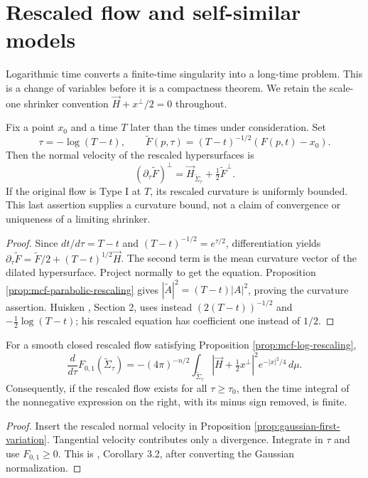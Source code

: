 \chapter{Rescaled flow and self-similar models}\label{sec:mcf-rescaled-models}
Logarithmic time converts a finite-time singularity into a long-time problem. This is a change of variables before it is a compactness theorem. We retain the scale-one shrinker convention $\vec H+x^\perp/2=0$ throughout.

\begin{proposition}\label{prop:mcf-log-rescaling}
Fix a point $x_0$ and a time $T$ later than the times under consideration. Set
\[
 \tau=-\log(T-t),\qquad
 \widetilde F(p,\tau)=(T-t)^{-1/2}(F(p,t)-x_0).
\]
Then the normal velocity of the rescaled hypersurfaces is
\[
 (\partial_\tau\widetilde F)^\perp=
 \vec H_{\widetilde\Sigma_\tau}+\tfrac12\widetilde F^\perp.
\]
If the original flow is Type I at $T$, its rescaled curvature is uniformly bounded. This last assertion supplies a curvature bound, not a claim of convergence or uniqueness of a limiting shrinker.
\end{proposition}
\begin{proof}
Since $dt/d\tau=T-t$ and $(T-t)^{-1/2}=e^{\tau/2}$, differentiation yields
$\partial_\tau\widetilde F=\widetilde F/2+(T-t)^{1/2}\vec H$.
The second term is the mean curvature vector of the dilated hypersurface. Project normally to get the equation. Proposition \ref{prop:mcf-parabolic-rescaling} gives $|\widetilde A|^2=(T-t)|A|^2$, proving the curvature assertion. Huisken \cite{Hui90}, Section 2, uses instead $(2(T-t))^{-1/2}$ and $-\frac12\log(T-t)$; his rescaled equation has coefficient one instead of $1/2$.
\end{proof}

\begin{proposition}\label{prop:mcf-rescaled-dissipation}
For a smooth closed rescaled flow satisfying Proposition \ref{prop:mcf-log-rescaling},
\[
 \frac{d}{d\tau}F_{0,1}(\widetilde\Sigma_\tau)
 =-(4\pi)^{-n/2}\int_{\widetilde\Sigma_\tau}
 \left|\vec H+\tfrac12x^\perp\right|^2e^{-|x|^2/4}\,d\mu.
\]
Consequently, if the rescaled flow exists for all $\tau\geq\tau_0$, then the time integral of the nonnegative expression on the right, with its minus sign removed, is finite.
\end{proposition}
\begin{proof}
Insert the rescaled normal velocity in Proposition \ref{prop:gaussian-first-variation}. Tangential velocity contributes only a divergence. Integrate in $\tau$ and use $F_{0,1}\geq0$. This is \cite{Hui90}, Corollary 3.2, after converting the Gaussian normalization.
\end{proof}

